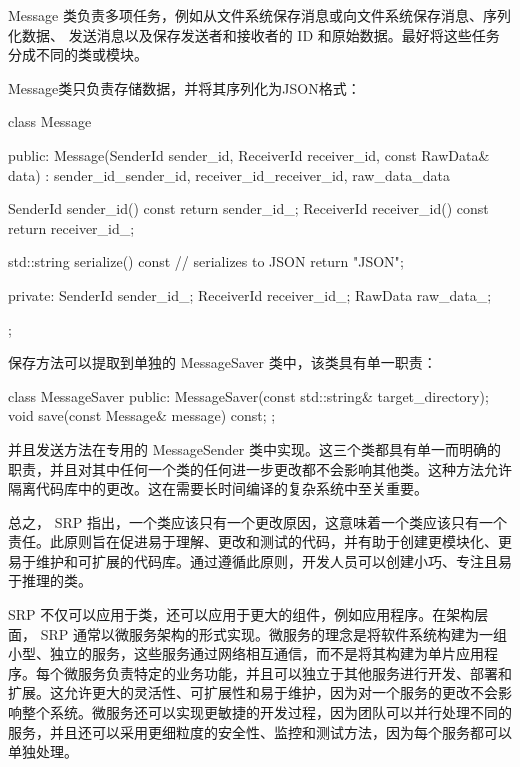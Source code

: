 Message 类负责多项任务，例如从文件系统保存消息或向文件系统保存消息、序列化数据、 发送消息以及保存发送者和接收者的 ID 和原始数据。最好将这些任务分成不同的类或模块。

Message类只负责存储数据，并将其序列化为JSON格式：

\begin{cpp}
class Message {
public:
    Message(SenderId sender_id, ReceiverId receiver_id,
            const RawData& data)
        : sender_id_{sender_id},
            receiver_id_{receiver_id}, raw_data_{data} {}

    SenderId sender_id() const { return sender_id_; }
    ReceiverId receiver_id() const { return receiver_id_; }

    std::string serialize() const {
        // serializes to JSON
        return {"JSON"};
    }

private:
    SenderId sender_id_;
    ReceiverId receiver_id_;
    RawData raw_data_;
};
\end{cpp}

保存方法可以提取到单独的 MessageSaver 类中，该类具有单一职责：

\begin{cpp}
class MessageSaver {
public:
    MessageSaver(const std::string& target_directory);
    void save(const Message& message) const;
};
\end{cpp}

并且发送方法在专用的 MessageSender 类中实现。这三个类都具有单一而明确的职责，并且对其中任何一个类的任何进一步更改都不会影响其他类。这种方法允许隔离代码库中的更改。这在需要长时间编译的复杂系统中至关重要。

总之， SRP 指出，一个类应该只有一个更改原因，这意味着一个类应该只有一个责任。此原则旨在促进易于理解、更改和测试的代码，并有助于创建更模块化、更易于维护和可扩展的代码库。通过遵循此原则，开发人员可以创建小巧、专注且易于推理的类。


SRP 不仅可以应用于类，还可以应用于更大的组件，例如应用程序。在架构层面， SRP 通常以微服务架构的形式实现。微服务的理念是将软件系统构建为一组小型、独立的服务，这些服务通过网络相互通信，而不是将其构建为单片应用程序。每个微服务负责特定的业务功能，并且可以独立于其他服务进行开发、部署和扩展。这允许更大的灵活性、可扩展性和易于维护，因为对一个服务的更改不会影响整个系统。微服务还可以实现更敏捷的开发过程，因为团队可以并行处理不同的服务，并且还可以采用更细粒度的安全性、监控和测试方法，因为每个服务都可以单独处理。


